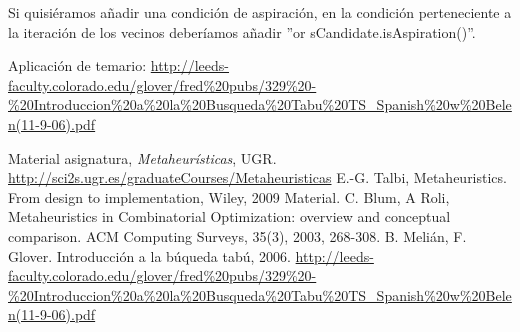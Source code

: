 \documentclass{llncs}
\begin{document}
Si quisi\'{e}ramos a\~{n}adir una condici\'{o}n de aspiraci\'{o}n, en la condici\'{o}n perteneciente a la iteraci\'{o}n de los vecinos deber\'{i}amos a\~{n}adir ''or sCandidate.isAspiration()''.

Aplicaci\'{o}n de temario: \url{http://leeds-faculty.colorado.edu/glover/fred\%20pubs/329\%20-\%20Introduccion\%20a\%20la\%20Busqueda\%20Tabu\%20TS_Spanish\%20w\%20Belen(11-9-06).pdf}

%
%
\begin{thebibliography}{5}

  Material asignatura,
  \textit{Metaheur\'{i}sticas},
  UGR. \url{http://sci2s.ugr.es/graduateCourses/Metaheuristicas}
  E.-G. Talbi, Metaheuristics. From design to implementation,
  Wiley, 2009 Material.
	C. Blum, A Roli, Metaheuristics in Combinatorial Optimization: overview and conceptual comparison. ACM Computing Surveys, 35(3), 2003, 268-308.
	B. Meli\'{a}n, F. Glover. Introducci\'{o}n a la b\'{u}queda tab\'{u}, 2006. \url{http://leeds-faculty.colorado.edu/glover/fred\%20pubs/329\%20-\%20Introduccion\%20a\%20la\%20Busqueda\%20Tabu\%20TS_Spanish\%20w\%20Belen(11-9-06).pdf}
 

\end{thebibliography}
\end{document}
